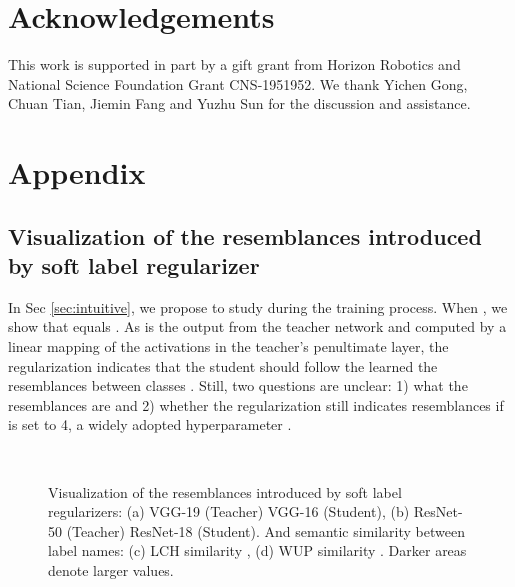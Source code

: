 \documentclass{article} \usepackage{iclr2021_conference,times}
\begin{document}
\section*{Acknowledgements}
This work is supported in part by a gift grant from Horizon Robotics and National Science Foundation Grant CNS-1951952. We thank Yichen Gong, Chuan Tian, Jiemin Fang and Yuzhu Sun for the discussion and assistance.




\appendix
\section{Appendix}
\subsection{Visualization of the resemblances introduced by soft label regularizer}
In Sec \ref{sec:intuitive}, we propose to study  during the training process. 
When , we show that  equals .
As  is the output from the teacher network and computed by a linear mapping of the activations in the teacher's penultimate layer, the regularization indicates that the student should follow the learned the resemblances between classes \citep{Hinton2015DistillingTK,muller2019does}. 
Still, two questions are unclear: 1) what the resemblances are and 2) whether the regularization still indicates resemblances if  is set to 4, a widely adopted hyperparameter \citep{Tian2020Contrastive}.


\begin{figure}[t]
    \centering
{} \quad
     \\
     \quad
    \caption{Visualization of the resemblances introduced by soft label regularizers: (a) VGG-19 (Teacher)  VGG-16 (Student), (b) ResNet-50 (Teacher)  ResNet-18 (Student). And semantic similarity between label names: (c) LCH similarity \citep{pedersen2004wordnet},  (d) WUP similarity \citep{pedersen2004wordnet}. Darker areas denote larger values.}
    \label{fig:resemblances}
\end{figure}
\end{document}
